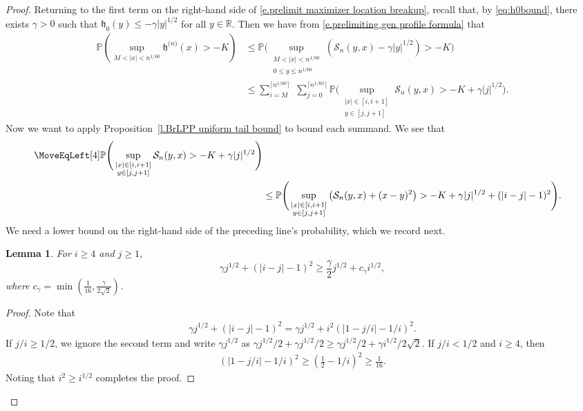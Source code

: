\documentclass[oneside,final,11pt]{amsart}
\newtheorem{lemma}[thm]{Lemma}
\theoremstyle{definition}
\newcommand{\fh}{\mathfrak{h}}
\newcommand{\h}{\fh^{{\scriptscriptstyle(}n{\scriptscriptstyle)}}}
\newcommand{\R}{\mathbb{R}}
\newcommand{\CS}{\mathcal{S}}
\renewcommand{\S}{\CS}
\newcommand{\1}[1]{\mathbf{1}_{#1}}
\newcommand{\hlim}{\mathfrak{h}}
\renewcommand{\P}{\mathbb P}
\numberwithin{equation}{section}
\begin{document}
\begin{proof}
Returning to the first term on the right-hand side of \eqref{e.prelimit maximizer location breakup}, recall that, by \eqref{eq:h0bound}, there exists $\gamma>0$ such that $\hlim_0(y) \leq -\gamma |y|^{1/2}$ for all $y\in \R$. Then we have from \eqref{e.prelimiting gen profile formula} that
%
\begin{align}
\P\left(\sup_{M<|x|<n^{1/60}} \h(x) > -K\right) &\leq \P\Bigg(\sup_{\substack{M<|x|<n^{1/60}\\ 0\leq y\leq n^{1/60}}}\left(\S_n(y, x) - \gamma |y|^{1/2}\right) > -K\Bigg)\nonumber\\
%
&\leq \sum_{i=M}^{\lceil n^{1/60}\rceil}\,\, \sum_{j=0}^{\lceil n^{1/60}\rceil}\P\Bigg(\sup_{\substack{|x|\in [i,i+1]\\ y \in [j,j+1]}}\S_n(y, x) > -K + \gamma |j|^{1/2}\Bigg). \label{e.maximizer bounding sum breakup}
\end{align}
%
Now we want to apply Proposition~\ref{l.BrLPP uniform tail bound} to bound each summand. We see that
%
\begin{align}
\MoveEqLeft[4]
\P\Bigg(\sup_{\substack{|x|\in [i,i+1]\\ y\in [j,j+1]}}\S_n(y, x) > -K + \gamma |j|^{1/2}\Bigg)\nonumber\\
%
& \leq \P\Bigg(\sup_{\substack{|x|\in [i,i+1]\\ y\in [j,j+1]}}\left(\S_n(y, x) + (x-y)^2\right) > -K + \gamma|j|^{1/2} + (|i-j|-1)^2\Bigg).\label{e.prob breakup double sum}
\end{align}
%
We need a lower bound on the right-hand side of the preceding line's probability, which we record next. 


\begin{lemma}
For $i\geq 4$ and $j\geq 1$,%
%
\begin{equation}\label{e.to show square}
\gamma j^{1/2} + (|i-j|-1)^2 \geq \frac{\gamma}{2}j^{1/2} + c_\gamma i^{1/2},
\end{equation}
%
where $c_\gamma = \min\left(\frac{1}{16}, \frac{\gamma}{2\sqrt{2}}\right)$.
\end{lemma}


\begin{proof}
Note that
%
\begin{align*}
\gamma j^{1/2} + (|i-j|-1)^2 = \gamma j^{1/2} + i^2(|1-j/i|-1/i)^2.
\end{align*}
%
If $j/i\geq 1/2$, we ignore the second term and write $\gamma j^{1/2}$ as $\gamma j^{1/2}/2 + \gamma j^{1/2}/2 \geq \gamma j^{1/2}/2 + \gamma i^{1/2}/2\sqrt2$.
%
If $j/i<1/2$ and $i\geq 4$, then
%
\begin{align*}
(|1-j/i|-1/i)^2 \geq (\tfrac{1}{2}-1/i)^2 \geq \frac{1}{16}.
\end{align*}
%
Noting that $i^2 \geq i^{1/2}$ completes the proof.
\end{proof}


\end{proof}
\end{document}
